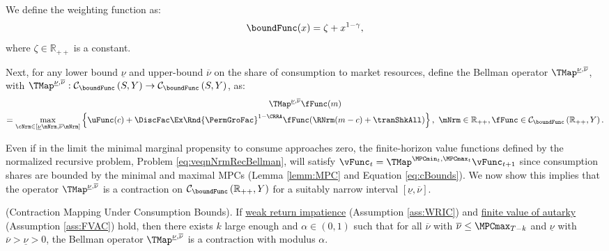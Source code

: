 \documentclass[BufferStockTheory]{subfiles}
\begin{document}
We define the weighting function as:
%
\begin{equation}
\boundFunc(x) = \zeta + x^{1-\gamma},
\end{equation}
where $\zeta \in \mathbb{R}_{++}$ is a constant.

\newcommand{\MPCminInf}{\underline{\nu}}
\newcommand{\MPCmaxInf}{\overline{\nu}}
  
Next, for any lower bound $\MPCminInf$ and upper-bound $\MPCmaxInf$ on the share of consumption to market resources, define the Bellman operator $\TMap^{\MPCminInf, \MPCmaxInf}$, with \textit{$\TMap^{\MPCminInf, \MPCmaxInf}:\mathcal{C}_{\boundFunc }\left( S,Y\right) \rightarrow \mathcal{C}_{\boundFunc }\left( S,Y\right) $}, as:
%
%
\begin{multline}
\TMap^{\MPCminInf, \MPCmaxInf} \fFunc(m) \\  = \max_{\cNrm \in
    [\MPCminInf \mNrm, \MPCmaxInf \mNrm]
  }  \left\{\uFunc(c) + \DiscFac\Ex\Rnd{\PermGroFac}^{1-\CRRA}\fFunc(\RNrm(m - c) + \tranShkAll)\right\}, \,\,  \mNrm\in \mathbb{R}_{++}, \fFunc\in \mathcal{C}_{\boundFunc }\left(\mathbb{R}_{++},Y\right).
\end{multline}

Even if in the limit the minimal marginal propensity to consume approaches zero, the finite-horizon value functions defined by the normalized recursive problem, Problem \eqref{eq:veqnNrmRecBellman}, will satisfy  $\vFunc_{t} = \TMap^{\MPCmin_{t}, \MPCmax_{t}}\vFunc_{t+1}$ since consumption shares are bounded by the minimal and maximal MPCs (Lemma \ref{lemm:MPC} and Equation \eqref{eq:cBounds}). We now show this implies that the operator $\TMap^{\MPCminInf, \MPCmaxInf}$ is a contraction on $\mathcal{C}_{\boundFunc }\left( \mathbb{R}_{++},Y\right)$ for a suitably narrow interval $[\MPCminInf, \MPCmaxInf]$.  

\begin{theorem}(Contraction Mapping Under Consumption Bounds). \label{thm:cmap}
If \hyperlink{WRIC}{weak return impatience} (Assumption \ref{ass:WRIC})  and  \hyperlink{FVAC}{finite value of autarky} (Assumption \ref{ass:FVAC}) hold, then there exists $k$ large enough and $\alpha\in (0,1)$ such that for all $\MPCmaxInf$ with $\MPCmaxInf\leq \MPCmax_{T-k}$ and $\MPCminInf$ with $\MPCmaxInf> \MPCminInf>0$, the Bellman operator $\TMap^{\MPCminInf, \MPCmaxInf}$ is a contraction with modulus $\alpha$.
\end{theorem}
\end{document}
